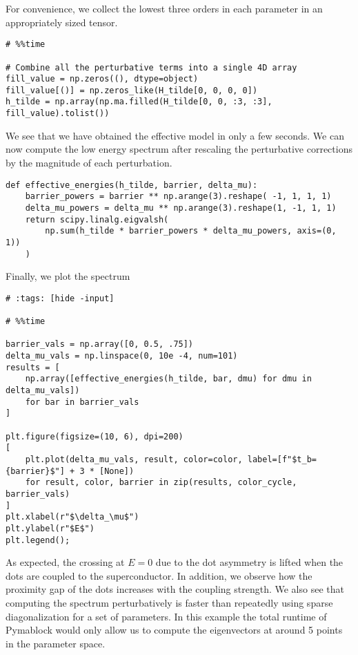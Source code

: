 For convenience, we collect the lowest three orders in each parameter in an
appropriately sized tensor.
%
\begin{verbatim}
# %%time

# Combine all the perturbative terms into a single 4D array
fill_value = np.zeros((), dtype=object)
fill_value[()] = np.zeros_like(H_tilde[0, 0, 0, 0])
h_tilde = np.array(np.ma.filled(H_tilde[0, 0, :3, :3], fill_value).tolist())
\end{verbatim}
%
We see that we have obtained the effective model in only a few seconds.
We can now compute the low energy spectrum after rescaling the perturbative
corrections by the magnitude of each perturbation.
%
\begin{verbatim}
def effective_energies(h_tilde, barrier, delta_mu):
    barrier_powers = barrier ** np.arange(3).reshape( -1, 1, 1, 1)
    delta_mu_powers = delta_mu ** np.arange(3).reshape(1, -1, 1, 1)
    return scipy.linalg.eigvalsh(
        np.sum(h_tilde * barrier_powers * delta_mu_powers, axis=(0, 1))
    )
\end{verbatim}
%
Finally, we plot the spectrum
%
\begin{verbatim}
# :tags: [hide -input]

# %%time

barrier_vals = np.array([0, 0.5, .75])
delta_mu_vals = np.linspace(0, 10e -4, num=101)
results = [
    np.array([effective_energies(h_tilde, bar, dmu) for dmu in delta_mu_vals])
    for bar in barrier_vals
]

plt.figure(figsize=(10, 6), dpi=200)
[
    plt.plot(delta_mu_vals, result, color=color, label=[f"$t_b={barrier}$"] + 3 * [None])
    for result, color, barrier in zip(results, color_cycle, barrier_vals)
]
plt.xlabel(r"$\delta_\mu$")
plt.ylabel(r"$E$")
plt.legend();
\end{verbatim}
%
%
As expected, the crossing at $E=0$ due to the dot asymmetry is lifted when the
dots are coupled to the superconductor. In addition, we observe how the
proximity gap of the dots increases with the coupling strength.
%
We also see that computing the spectrum perturbatively is faster than
repeatedly using sparse diagonalization for a set of parameters.
In this example the total runtime of Pymablock would only allow us to compute
the  eigenvectors at around 5 points in the parameter space.
